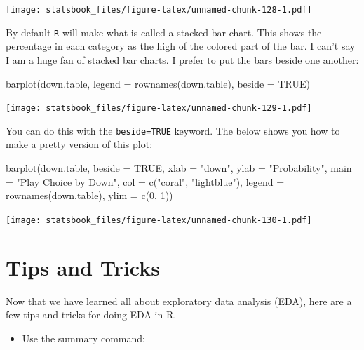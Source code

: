 \documentclass[
]{book}
\newenvironment{Shaded}{\begin{snugshade}}{\end{snugshade}}
\newcommand{\AttributeTok}[1]{\textcolor[rgb]{0.77,0.63,0.00}{#1}}
\newcommand{\ConstantTok}[1]{\textcolor[rgb]{0.00,0.00,0.00}{#1}}
\newcommand{\DecValTok}[1]{\textcolor[rgb]{0.00,0.00,0.81}{#1}}
\newcommand{\FunctionTok}[1]{\textcolor[rgb]{0.00,0.00,0.00}{#1}}
\newcommand{\NormalTok}[1]{#1}
\newcommand{\StringTok}[1]{\textcolor[rgb]{0.31,0.60,0.02}{#1}}
\providecommand{\tightlist}{%
  \setlength{\itemsep}{0pt}\setlength{\parskip}{0pt}}
\theoremstyle{definition}
\theoremstyle{definition}
\theoremstyle{definition}
\theoremstyle{definition}
\theoremstyle{remark}
\begin{document}
\texttt{[image: statsbook\_files/figure-latex/unnamed-chunk-128-1.pdf]}

By default \texttt{R} will make what is called a stacked bar chart. This shows the percentage in each category as the high of the colored part of the bar. I can't say I am a huge fan of stacked bar charts. I prefer to put the bars beside one another:

\begin{Shaded}
\begin{Highlighting}[]
\FunctionTok{barplot}\NormalTok{(down.table, }\AttributeTok{legend =} \FunctionTok{rownames}\NormalTok{(down.table), }\AttributeTok{beside =} \ConstantTok{TRUE}\NormalTok{)}
\end{Highlighting}
\end{Shaded}

\texttt{[image: statsbook\_files/figure-latex/unnamed-chunk-129-1.pdf]}

You can do this with the \texttt{beside=TRUE} keyword. The below shows you how to make a pretty version of this plot:

\begin{Shaded}
\begin{Highlighting}[]
\FunctionTok{barplot}\NormalTok{(down.table, }\AttributeTok{beside =} \ConstantTok{TRUE}\NormalTok{, }\AttributeTok{xlab =} \StringTok{"down"}\NormalTok{, }\AttributeTok{ylab =} \StringTok{"Probability"}\NormalTok{, }\AttributeTok{main =} \StringTok{"Play Choice by Down"}\NormalTok{,}
    \AttributeTok{col =} \FunctionTok{c}\NormalTok{(}\StringTok{"coral"}\NormalTok{, }\StringTok{"lightblue"}\NormalTok{), }\AttributeTok{legend =} \FunctionTok{rownames}\NormalTok{(down.table), }\AttributeTok{ylim =} \FunctionTok{c}\NormalTok{(}\DecValTok{0}\NormalTok{, }\DecValTok{1}\NormalTok{))}
\end{Highlighting}
\end{Shaded}

\texttt{[image: statsbook\_files/figure-latex/unnamed-chunk-130-1.pdf]}

\hypertarget{tips-and-tricks}{%
\section{Tips and Tricks}\label{tips-and-tricks}}

Now that we have learned all about exploratory data analysis (EDA), here are a few tips and tricks for doing EDA in R.

\begin{itemize}
\tightlist
\item
  Use the summary command:
\end{itemize}
\end{document}
